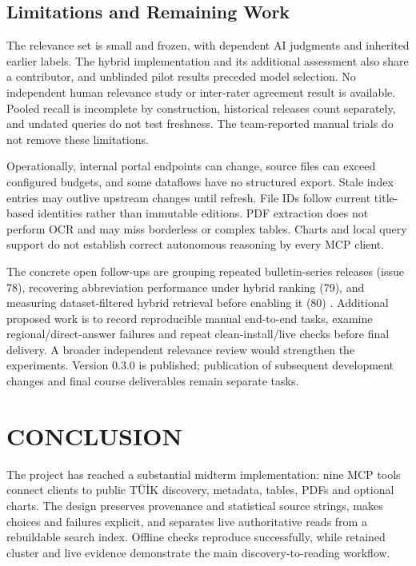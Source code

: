 \documentclass[a4paper,12pt]{report}
\newcommand{\tuik}{T\"U\.{I}K}
\begin{document}
\section{Limitations and Remaining Work}
The relevance set is small and frozen, with dependent AI judgments and inherited earlier labels. The hybrid implementation and its additional assessment also share a contributor, and unblinded pilot results preceded model selection. No independent human relevance study or inter-rater agreement result is available. Pooled recall is incomplete by construction, historical releases count separately, and undated queries do not test freshness. The team-reported manual trials do not remove these limitations.

Operationally, internal portal endpoints can change, source files can exceed configured budgets, and some dataflows have no structured export. Stale index entries may outlive upstream changes until refresh. File IDs follow current title-based identities rather than immutable editions. PDF extraction does not perform OCR and may miss borderless or complex tables. Charts and local query support do not establish correct autonomous reasoning by every MCP client.

The concrete open follow-ups are grouping repeated bulletin-series releases (issue 78), recovering abbreviation performance under hybrid ranking (79), and measuring dataset-filtered hybrid retrieval before enabling it (80) \cite{remaining-issues}. Additional proposed work is to record reproducible manual end-to-end tasks, examine regional/direct-answer failures and repeat clean-install/live checks before final delivery. A broader independent relevance review would strengthen the experiments. Version 0.3.0 is published; publication of subsequent development changes and final course deliverables remain separate tasks.

\chapter{CONCLUSION}
The project has reached a substantial midterm implementation: nine MCP tools connect clients to public \tuik{} discovery, metadata, tables, PDFs and optional charts. The design preserves provenance and statistical source strings, makes choices and failures explicit, and separates live authoritative reads from a rebuildable search index. Offline checks reproduce successfully, while retained cluster and live evidence demonstrate the main discovery-to-reading workflow.
\end{document}
